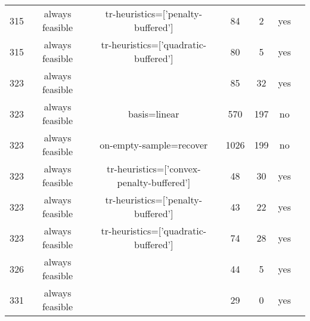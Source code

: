 \begin{scriptsize}
\begin{center}
\begin{longtable}{ccccccc}
315 & always feasible &        tr-heuristics=['penalty-buffered'] &     84 &      2 &     yes\\
315 & always feasible &      tr-heuristics=['quadratic-buffered'] &     80 &      5 &     yes\\
323 & always feasible &                                           &     85 &     32 &     yes\\
323 & always feasible &                              basis=linear &    570 &    197 &      no\\
323 & always feasible &                   on-empty-sample=recover &   1026 &    199 &      no\\
323 & always feasible & tr-heuristics=['convex-penalty-buffered'] &     48 &     30 &     yes\\
323 & always feasible &        tr-heuristics=['penalty-buffered'] &     43 &     22 &     yes\\
323 & always feasible &      tr-heuristics=['quadratic-buffered'] &     74 &     28 &     yes\\
326 & always feasible &                                           &     44 &      5 &     yes\\
331 & always feasible &                                           &     29 &      0 &     yes
\end{longtable}
\end{center}
\end{scriptsize}
